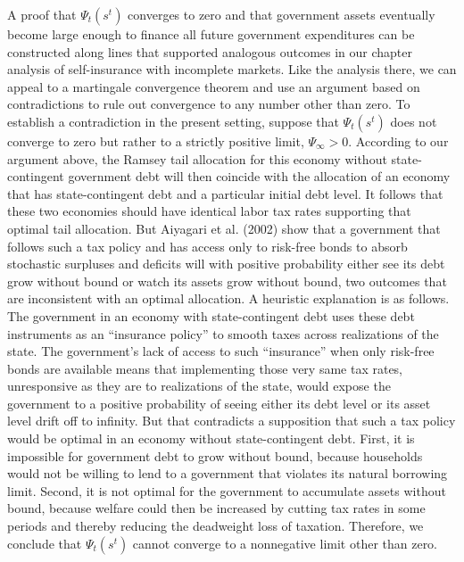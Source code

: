 A proof that $\Psi_t(s^t)$  converges to zero and that government
assets eventually  become large enough to finance all future government
expenditures %
 can be  constructed along
lines that supported analogous outcomes in our chapter
 analysis of  self-insurance with incomplete markets.
Like the analysis there, we can  appeal to a martingale convergence theorem
and use an argument based on contradictions to rule out
convergence to any number other than zero. To establish a
contradiction in the present setting, suppose that $\Psi_t(s^t)$
does not converge to zero but rather to a strictly positive limit,
$\Psi_\infty > 0$. According to our argument above, the Ramsey
tail allocation for this economy without state-contingent
government debt will then coincide with the allocation of an
economy that has state-contingent debt and a particular initial
debt level. It follows that these two economies should have
identical labor tax rates supporting that optimal tail allocation.
But Aiyagari et al. (2002) show that a government that follows
such a tax policy and has access only to risk-free bonds to absorb
stochastic surpluses and deficits will with positive probability
 either see its debt grow without bound or watch its assets grow without
bound, two outcomes that are  inconsistent with an optimal
allocation. A heuristic explanation is as follows. The
government in an economy with state-contingent debt uses these
debt instruments as an ``insurance policy'' to smooth taxes
across realizations of the state. The government's lack of access to  such
``insurance'' when only risk-free bonds are available
means that implementing those very same tax rates, unresponsive as
they are to realizations of the state, would  expose the
government to a positive probability of seeing either its debt
level or its asset level drift off to infinity. But that
contradicts a supposition that such a tax policy would be optimal
in an economy without state-contingent debt. First, it is
impossible for government debt to grow without bound, because
households would not be willing to lend to a government that
violates its natural borrowing limit. Second, it is not optimal
for the government to accumulate assets without bound, because
welfare could then be increased by cutting tax rates in some
periods and thereby reducing the deadweight loss of
taxation. Therefore, we conclude
that $\Psi_t(s^t)$ cannot converge to a nonnegative limit other
than zero.

